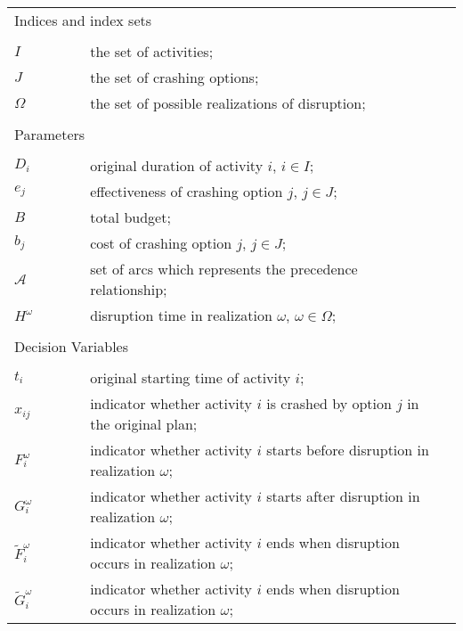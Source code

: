 \documentclass[11pt]{article}
\begin{document}
\begin{table}[H]
	\begin{tabular}{ l l l l }
		\multicolumn{4}{l}{Indices and index sets} \\
		\\
		\(I\) & \(\qquad\) & the set of activities;&\\
		\(J\) & \(\qquad\) & the set of crashing options;&\\
		\(\Omega\) & \(\qquad\) & the set of possible realizations of disruption;&\\
		\\
		\multicolumn{4}{l}{Parameters} \\
		\\
		\(D_{i}\)& \(\qquad\) & original duration of activity \(i\), \(i \in I\);&\\
		\(e_{j}\) & \(\qquad\) & effectiveness of crashing option \(j\), \(j \in J\);&\\
		\(B\) & \(\qquad\) & total budget;&\\
		\(b_{j}\) & \(\qquad\) & cost of crashing option \(j\), \(j \in J\);&\\
		\(\mathcal{A}\) &\(\qquad\) & set of arcs which represents the precedence relationship;&\\
		\(H^\omega\) &\(\qquad\) & disruption time in realization \(\omega\), \(\omega \in \Omega\);&\\
		\\
		\multicolumn{4}{l}{Decision Variables}\\
		\\
		\(t_{i}\) & \(\qquad\) & original starting time of activity \(i\);&\\
		\(x_{ij}\) & \(\qquad\) & indicator whether activity \(i\) is crashed by option \(j\) in the original plan; &\\
		\(F_i^\omega\) & \(\qquad\) & indicator whether activity \(i\) starts before disruption in realization \(\omega\);&\\
		\(G_i^\omega\) & \(\qquad\) & indicator whether activity \(i\) starts after disruption in realization \(\omega\);&\\
		\(\tilde{F}_i^\omega\) & \(\qquad\) & indicator whether activity \(i\) ends when disruption occurs in realization \(\omega\); &\\
		\(\tilde{G}_i^\omega\) & \(\qquad\) & indicator whether activity \(i\) ends when disruption occurs in realization \(\omega\); &\\
	\end{tabular}
\end{table}
\end{document}
